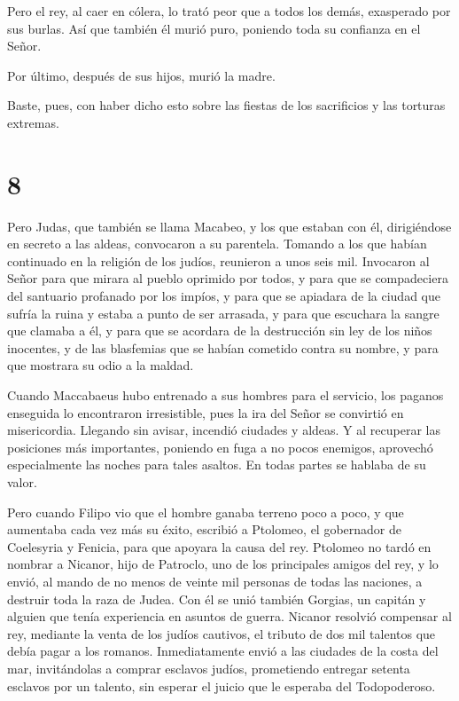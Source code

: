  Pero el rey, al caer en cólera, lo trató peor que a
todos los demás, exasperado por sus burlas.  Así que
también él murió puro, poniendo toda su confianza en el Señor.

 Por último, después de sus hijos, murió la madre.

 Baste, pues, con haber dicho esto sobre las fiestas de
los sacrificios y las torturas extremas.

\hypertarget{section-7}{%
\section{8}\label{section-7}}

 Pero Judas, que también se llama Macabeo, y los que
estaban con él, dirigiéndose en secreto a las aldeas, convocaron a su
parentela. Tomando a los que habían continuado en la religión de los
judíos, reunieron a unos seis mil.  Invocaron al Señor
para que mirara al pueblo oprimido por todos, y para que se compadeciera
del santuario profanado por los impíos,  y para que se
apiadara de la ciudad que sufría la ruina y estaba a punto de ser
arrasada, y para que escuchara la sangre que clamaba a él,
 y para que se acordara de la destrucción sin ley de los
niños inocentes, y de las blasfemias que se habían cometido contra su
nombre, y para que mostrara su odio a la maldad.

 Cuando Maccabaeus hubo entrenado a sus hombres para el
servicio, los paganos enseguida lo encontraron irresistible, pues la ira
del Señor se convirtió en misericordia.  Llegando sin
avisar, incendió ciudades y aldeas. Y al recuperar las posiciones más
importantes, poniendo en fuga a no pocos enemigos, 
aprovechó especialmente las noches para tales asaltos. En todas partes
se hablaba de su valor.

 Pero cuando Filipo vio que el hombre ganaba terreno poco
a poco, y que aumentaba cada vez más su éxito, escribió a Ptolomeo, el
gobernador de Coelesyria y Fenicia, para que apoyara la causa del rey.
 Ptolomeo no tardó en nombrar a Nicanor, hijo de Patroclo,
uno de los principales amigos del rey, y lo envió, al mando de no menos
de veinte mil personas de todas las naciones, a destruir toda la raza de
Judea. Con él se unió también Gorgias, un capitán y alguien que tenía
experiencia en asuntos de guerra.  Nicanor resolvió
compensar al rey, mediante la venta de los judíos cautivos, el tributo
de dos mil talentos que debía pagar a los romanos. 
Inmediatamente envió a las ciudades de la costa del mar, invitándolas a
comprar esclavos judíos, prometiendo entregar setenta esclavos por un
talento, sin esperar el juicio que le esperaba del Todopoderoso.

